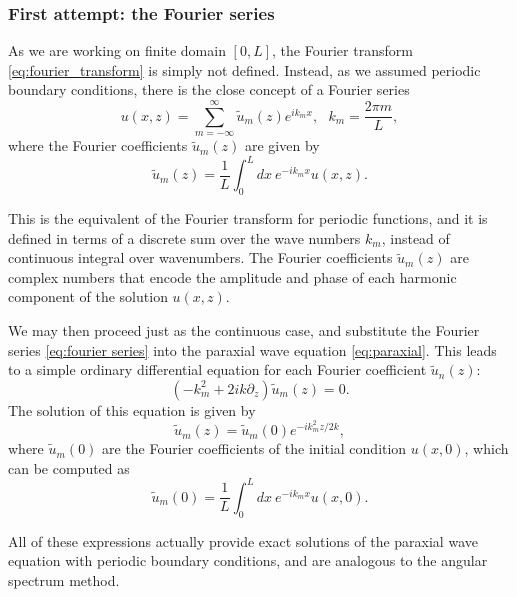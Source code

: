 \documentclass[openany,a4paper,oneside,11pt]{article}
\begin{document}
\subsubsection{First attempt: the Fourier series}

As we are working on finite domain $[0,L]$, the Fourier transform \eqref{eq:fourier_transform} is simply not defined. Instead, as we assumed periodic boundary conditions, there is the close concept of a Fourier series
\begin{equation}
    \label{eq:fourier series}
    u(x,z) = \sum_{m=-\infty}^{\infty} \tilde{u}_m(z) e^{i k_m x}, \ \ \ k_m = \frac{2\pi m}{L},
\end{equation}
where the Fourier coefficients $\tilde{u}_m(z)$ are given by
\begin{equation}
    \tilde{u}_m(z) = \frac{1}{L} \int_0^L dx \ e^{-i k_m x} u(x,z).
\end{equation}

This is the equivalent of the Fourier transform for periodic functions, and it is defined in terms of a discrete sum over the wave numbers $k_m$, instead of continuous integral over wavenumbers. The Fourier coefficients $\tilde{u}_m(z)$ are complex numbers that encode the amplitude and phase of each harmonic component of the solution $u(x,z)$.

We may then proceed just as the continuous case, and substitute the Fourier series \eqref{eq:fourier series} into the paraxial wave equation \eqref{eq:paraxial}. This leads to a simple ordinary differential equation for each Fourier coefficient $\tilde{u}_n(z)$:
\begin{equation}
    \left( -k_m^2 + 2ik \partial_z \right) \tilde{u}_m(z) = 0.
\end{equation}
The solution of this equation is given by
\begin{equation}
    \label{eq:solution_paraxial_fourier_discrete}
    \tilde{u}_m(z) = \tilde{u}_m(0) e^{-i k_m^2 z / 2k},
\end{equation}
where $\tilde{u}_m(0)$ are the Fourier coefficients of the initial condition $u(x,0)$, which can be computed as
\begin{equation}
    \tilde{u}_m(0) = \frac{1}{L} \int_0^L dx \ e^{-i k_m x} u(x,0).
\end{equation}

All of these expressions actually provide exact solutions of the paraxial wave equation with periodic boundary conditions, and are analogous to the angular spectrum method. 
\end{document}

